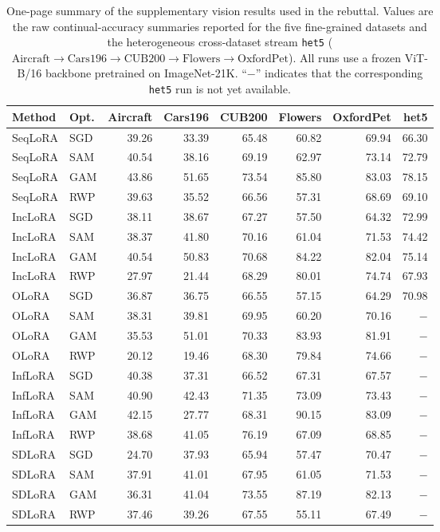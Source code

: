 
\begin{table}[ht]
\centering
\caption{%
  One-page summary of the supplementary vision results used in the rebuttal.
  Values are the raw continual-accuracy summaries reported for the five
  fine-grained datasets and the heterogeneous cross-dataset stream
  \texttt{het5} ($\text{Aircraft} \rightarrow \text{Cars196} \rightarrow
  \text{CUB200} \rightarrow \text{Flowers} \rightarrow \text{OxfordPet}$).
  All runs use a frozen ViT-B/16 backbone pretrained on ImageNet-21K.
  ``$-$'' indicates that the corresponding \texttt{het5} run is not yet available.
}
\label{tab:rebuttal_vision_onepage}
\setlength{\tabcolsep}{4.0pt}
\renewcommand{\arraystretch}{0.92}
\scriptsize
\begin{tabular}{@{}l l r r r r r r@{}}
\toprule
\textbf{Method} & \textbf{Opt.} & \textbf{Aircraft} & \textbf{Cars196} & \textbf{CUB200} & \textbf{Flowers} & \textbf{OxfordPet} & \textbf{het5} \\
\midrule
SeqLoRA & SGD & 39.26 & 33.39 & 65.48 & 60.82 & 69.94 & 66.30 \\
SeqLoRA & SAM & 40.54 & 38.16 & 69.19 & 62.97 & 73.14 & 72.79 \\
SeqLoRA & GAM & 43.86 & 51.65 & 73.54 & 85.80 & 83.03 & 78.15 \\
SeqLoRA & RWP & 39.63 & 35.52 & 66.56 & 57.31 & 68.69 & 69.10 \\
\addlinespace[2pt]
IncLoRA & SGD & 38.11 & 38.67 & 67.27 & 57.50 & 64.32 & 72.99 \\
IncLoRA & SAM & 38.37 & 41.80 & 70.16 & 61.04 & 71.53 & 74.42 \\
IncLoRA & GAM & 40.54 & 50.83 & 70.68 & 84.22 & 82.04 & 75.14 \\
IncLoRA & RWP & 27.97 & 21.44 & 68.29 & 80.01 & 74.74 & 67.93 \\
\addlinespace[2pt]
OLoRA & SGD & 36.87 & 36.75 & 66.55 & 57.15 & 64.29 & 70.98 \\
OLoRA & SAM & 38.31 & 39.81 & 69.95 & 60.20 & 70.16 & $-$ \\
OLoRA & GAM & 35.53 & 51.01 & 70.33 & 83.93 & 81.91 & $-$ \\
OLoRA & RWP & 20.12 & 19.46 & 68.30 & 79.84 & 74.66 & $-$ \\
\addlinespace[2pt]
InfLoRA & SGD & 40.38 & 37.31 & 66.52 & 67.31 & 67.57 & $-$ \\
InfLoRA & SAM & 40.90 & 42.43 & 71.35 & 73.09 & 73.43 & $-$ \\
InfLoRA & GAM & 42.15 & 27.77 & 68.31 & 90.15 & 83.09 & $-$ \\
InfLoRA & RWP & 38.68 & 41.05 & 76.19 & 67.09 & 68.85 & $-$ \\
\addlinespace[2pt]
SDLoRA & SGD & 24.70 & 37.93 & 65.94 & 57.47 & 70.47 & $-$ \\
SDLoRA & SAM & 37.91 & 41.01 & 67.95 & 61.05 & 71.53 & $-$ \\
SDLoRA & GAM & 36.31 & 41.04 & 73.55 & 87.19 & 82.13 & $-$ \\
SDLoRA & RWP & 37.46 & 39.26 & 67.55 & 55.11 & 67.49 & $-$ \\
\bottomrule
\end{tabular}
\end{table}

